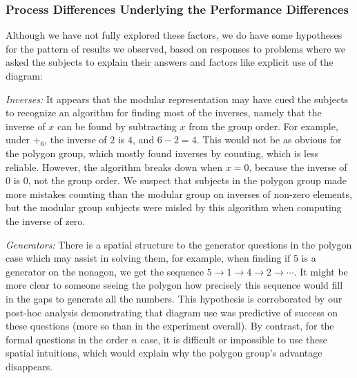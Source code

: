 \documentclass[man,10pt]{apa6}
\begin{document}
\subsubsection{Process Differences Underlying the Performance Differences}
Although we have not fully explored these factors, we do have some hypotheses for the pattern of results we observed, based on responses to problems where we asked the subjects to explain their answers and factors like explicit use of the diagram:\par 
\textit{Inverses:} It appears that the modular representation may have cued the subjects to recognize an algorithm for finding most of the inverses, namely that the inverse of $x$ can be found by subtracting $x$ from the group order. For example, under $+_6$, the inverse of $2$ is $4$, and $6-2 = 4$. This would not be as obvious for the polygon group, which mostly found inverses by counting, which is less reliable. However, the algorithm breaks down when $x = 0$, because the inverse of $0$ is $0$, not the group order. We suspect that subjects in the polygon group made more mistakes counting than the modular group on inverses of non-zero elements, but the modular group subjects were misled by this algorithm when computing the inverse of zero. \par
\textit{Generators:} There is a spatial structure to the generator questions in the polygon case which may assist in solving them, for example, when finding if $5$ is a generator on the nonagon, we get the sequence $5 \rightarrow 1 \rightarrow 4 \rightarrow 2 \rightarrow \cdots$. It might be more clear to someone seeing the polygon how precisely this sequence would fill in the gaps to generate all the numbers. This hypothesis is corroborated by our post-hoc analysis demonstrating that diagram use was predictive of success on these questions (more so than in the experiment overall). By contrast, for the formal questions in the order $n$ case, it is difficult or impossible to use these spatial intuitions, which would explain why the polygon group's advantage disappears.
\end{document}
